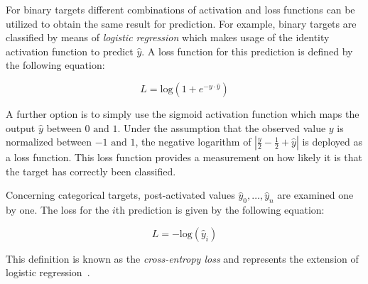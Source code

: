 \documentclass[draft,final]{vutinfth} %
\begin{document}
    For binary targets different combinations of activation and loss functions can be utilized to obtain the same result for prediction.
    For example, binary targets are classified by means of \textit{logistic regression} which makes usage of the identity activation function to predict $\hat{y}$.
    A loss function for this prediction is defined by the following equation:

    \begin{equation}
        L=\text{log}(1+e^{-y\cdot\hat{y}})
    \end{equation}

    A further option is to simply use the sigmoid activation function which maps the output $\hat{y}$ between $0 \text{ and } 1$.
    Under the assumption that the observed value $y$ is normalized between $-1 \text{ and } 1$, the negative logarithm of $|\frac{y}{2}-\frac{1}{2}+\hat{y}|$ is deployed as a loss function.
    This loss function provides a measurement on how likely it is that the target has correctly been classified.

    Concerning categorical targets, post-activated values $\hat{y}_0,\ldots,\hat{y}_n$ are examined one by one.
    The loss for the $i$th prediction is given by the following equation:

    \begin{equation}
        L=-\text{log}(\hat{y}_i)
    \end{equation}

    This definition is known as the \textit{cross-entropy loss} and represents the extension of logistic regression~\citep{aggarwal_neural_2018}.
\end{document}
